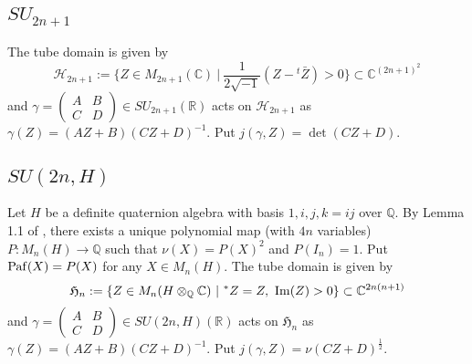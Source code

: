 \documentclass[11pt]{amsart}
\numberwithin{equation}{section}
\theoremstyle{definition}
\begin{document}
\subsection{$SU_{2n+1}$}
The tube domain is given by
$$\mathcal{H}_{2n+1}:=\{Z\in M_{2n+1}({\mathbb{C}})\ |\ \frac{1}{2\sqrt{-1}}(Z-{}^t{\bar Z})>0 \}\subset {\mathbb{C}}^{(2n+1)^2}$$
and $\gamma=\left(
\begin{array}{cc}
A & B \\
C & D
\end{array}\right)\in SU_{2n+1}({\mathbb{R}})$ acts on $\mathcal{H}_{2n+1}$ as
$\gamma(Z)=(AZ+B)(CZ+D)^{-1}$. Put $j(\gamma,Z)=\det(CZ+D)$.

\subsection{$SU(2n,H)$}
Let $H$ be a definite quaternion algebra with basis ${1,i,j,k=ij}$ over ${\mathbb{Q}}$.
By Lemma 1.1 of \cite{Yamana}, there exists a unique polynomial map (with $4n$ variables) $P:M_n(H){\longrightarrow} {\mathbb{Q}}$ such that
$\nu(X)=P(X)^2$ and $P(I_n)=1$. Put ${\rm Paf}(X)=P(X)$ for any $X\in M_n(H)$.
The tube domain is given by
$$\mathfrak{H}_{n}:=\{Z\in M_{n}(H\otimes_{\mathbb{Q}}{\mathbb{C}})\ |\ {}^\ast Z=Z,\ {\rm Im}(Z)>0 \}\subset {\mathbb{C}}^{2n(n+1)}$$
and $\gamma=\left(
\begin{array}{cc}
A & B \\
C & D
\end{array}\right)\in SU(2n,H)({\mathbb{R}})$ acts on $\mathfrak{H}_n$ as
$\gamma(Z)=(AZ+B)(CZ+D)^{-1}$. Put $j(\gamma,Z)=\nu(CZ+D)^{\frac{1}{2}}$.
\end{document}
